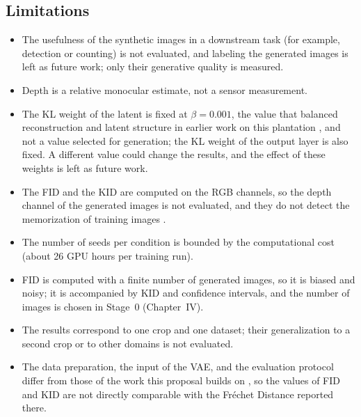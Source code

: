\subsection{Limitations}

\begin{itemize}
  \item The usefulness of the synthetic images in a downstream task (for example, detection or counting) is not evaluated, and labeling the generated images is left as future work; only their generative quality is measured.
  \item Depth is a relative monocular estimate, not a sensor measurement.
  \item The KL weight of the latent is fixed at $\beta=0.001$, the value that balanced reconstruction and latent structure in earlier work on this plantation \cite{XieLi2025VAE}, and not a value selected for generation; the KL weight of the output layer is also fixed. A different value could change the results, and the effect of these weights is left as future work.
  \item The FID and the KID are computed on the RGB channels, so the depth channel of the generated images is not evaluated, and they do not detect the memorization of training images \cite{Stein2023}.
  \item The number of seeds per condition is bounded by the computational cost (about 26 GPU hours per training run).
  \item FID is computed with a finite number of generated images, so it is biased and noisy; it is accompanied by KID and confidence intervals, and the number of images is chosen in Stage~0 (Chapter~IV).
  \item The results correspond to one crop and one dataset; their generalization to a second crop or to other domains is not evaluated.
  \item The data preparation, the input of the VAE, and the evaluation protocol differ from those of the work this proposal builds on \cite{Gonzalez2026}, so the values of FID and KID are not directly comparable with the Fr\'echet Distance reported there.
\end{itemize}
